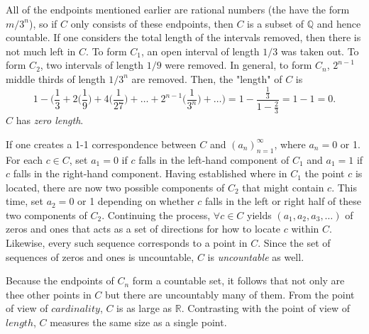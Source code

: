 \documentclass{article}
\begin{document}
            All of the endpoints mentioned earlier are rational numbers (the have the form $m/3^n$), so if $C$ only consists of these endpoints, then $C$ is a subset of $\mathbb{Q}$ and hence countable. If one considers the total length of the intervals removed, then there is not much left in $C$. To form $C_1$, an open interval of length $1/3$ was taken out. To form $C_2$, two intervals of length $1/9$ were removed. In general, to form $C_n$, $2^{n-1}$ middle thirds of length $1/3^n$ are removed. Then, the "length" of $C$ is
            \begin{equation*}
                1 - \bigg(\frac{1}{3}+ 2\bigg(\frac{1}{9}\bigg) + 4\bigg(\frac{1}{27}\bigg)+\dots+ 2^{n-1}\bigg(\frac{1}{3^n}\bigg)+\dots\bigg) = 1 - \frac{\frac{1}{3}}{1-\frac{2}{3}} = 1-1 =0.
            \end{equation*}
            $C$ has \textit{zero length}.
            
            If one creates a 1-1 correspondence between $C$ and $(a_n)_{n=1}^\infty$, where $a_n = 0$ or 1. For each $c \in C$, set $a_1=0$ if $c$ falls in the left-hand component of $C_1$ and $a_1=1$ if $c$ falls in the right-hand component. Having established where in $C_1$ the point $c$ is located, there are now two possible components of $C_2$ that might contain $c$. This time, set $a_2=0$ or 1 depending on whether $c$ falls in the left or right half of these two components of $C_2$. Continuing the process, $\forall c \in C$ yields $(a_1,a_2,a_3,\dots)$ of zeros and ones that acts as a set of directions for how to locate $c$ within $C$. Likewise, every such sequence corresponds to a point in $C$. Since the set of sequences of zeros and ones is uncountable, $C$ is \textit{uncountable} as well.
            
            Because the endpoints of $C_n$ form a countable set, it follows that not only are thee other points in $C$ but there are uncountably many of them. From the point of view of $cardinality$, $C$ is as large as $\mathbb{R}$. Contrasting with the point of view of $length$, $C$ measures the same size as a single point. 
            
\end{document}
